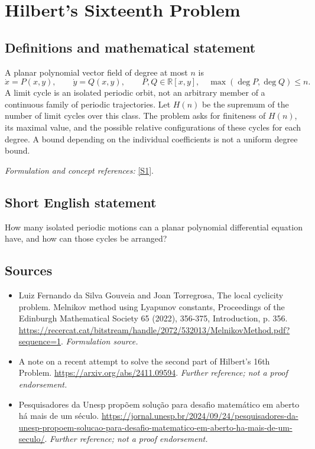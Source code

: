 \documentclass[11pt]{article}
\begin{document}
\section*{\texorpdfstring{Hilbert's Sixteenth Problem}{Hilbert's Sixteenth Problem}}\label{statement}
\subsection{Definitions and mathematical statement}
A planar polynomial vector field of degree at most $n$ is
\[
 \dot x=P(x,y),\qquad\dot y=Q(x,y),\qquad P,Q\in{\mathbb{R}}[x,y],\quad\max(\deg P,\deg Q)\le n.
\]
A limit cycle is an isolated periodic orbit, not an arbitrary member of a continuous family of periodic trajectories. Let $H(n)$ be the supremum of the number of limit cycles over this class. The problem asks for finiteness of $H(n)$, its maximal value, and the possible relative configurations of these cycles for each degree. A bound depending on the individual coefficients is not a uniform degree bound.
\par\smallskip\textit{Formulation and concept references:} \href{https://recercat.cat/bitstream/handle/2072/532013/MelnikovMethod.pdf?sequence=1}{[S1]}.

\subsection{Short English statement}
How many isolated periodic motions can a planar polynomial differential equation have, and how can those cycles be arranged?
\subsection{Sources}
\begin{itemize}
\item[S1]Luiz Fernando da Silva Gouveia and Joan Torregrosa, The local cyclicity problem. Melnikov method using Lyapunov constants, Proceedings of the Edinburgh Mathematical Society 65 (2022), 356-375, Introduction, p. 356.
\url{https://recercat.cat/bitstream/handle/2072/532013/MelnikovMethod.pdf?sequence=1}.
\textit{Formulation source.}
\item[S2]A note on a recent attempt to solve the second part of Hilbert's 16th Problem.
\url{https://arxiv.org/abs/2411.09594}.
\textit{Further reference; not a proof endorsement.}
\item[S3]Pesquisadores da Unesp propõem solução para desafio matemático em aberto há mais de um século.
\url{https://jornal.unesp.br/2024/09/24/pesquisadores-da-unesp-propoem-solucao-para-desafio-matematico-em-aberto-ha-mais-de-um-seculo/}.
\textit{Further reference; not a proof endorsement.}
\end{itemize}
\end{document}
